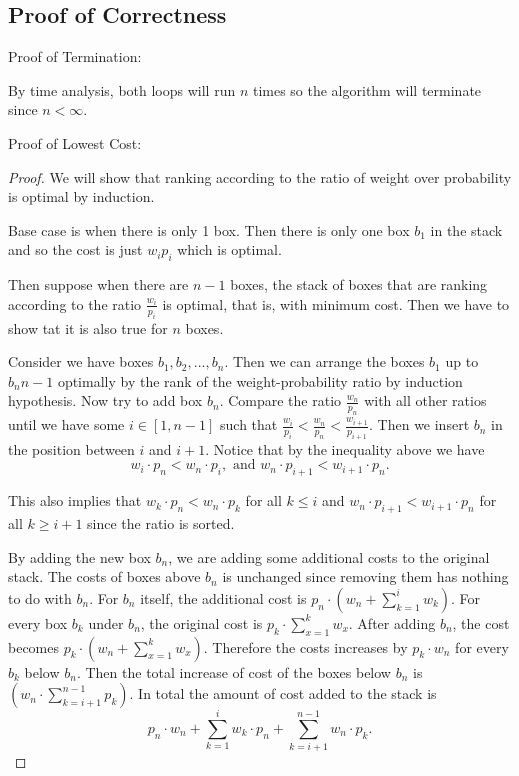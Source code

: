 \documentclass[11pt, oneside]{article}   	%
\begin{document}
\subsection{Proof of Correctness}
Proof of Termination:

By time analysis, both loops will run $n$ times so the algorithm will terminate since $n < \infty$.

Proof of Lowest Cost:
\begin{proof}

We will show that ranking according to the ratio of weight over probability is optimal by induction.

Base case is when there is only 1 box. Then there is only one box $b_1$ in the stack and so the cost is just $w_ip_i$ which is optimal.

Then suppose when there are $n-1$ boxes, the stack of boxes that are ranking according to the ratio $\frac{w_i}{p_i}$ is optimal, that is, with minimum cost. Then we have to show tat it is also true for $n$ boxes.

Consider we have boxes $b_1,b_2,...,b_n$. Then we can arrange the boxes $b_1$ up to $b_n{n-1}$ optimally by the rank of the weight-probability ratio by induction hypothesis. Now try to add box $b_n$. Compare the ratio $\frac{w_n}{p_n}$ with all other ratios until we have some $i \in [1,n-1]$ such that $\frac{w_i}{p_i}<\frac{w_n}{p_n}<\frac{w_{i+1}}{p_{i+1}}$. Then we insert $b_n$ in the position between $i$ and $i+1$. Notice that by the inequality above we have
$$w_i\cdot p_n < w_n\cdot p_i, \text{ and } w_n\cdot p_{i+1} < w_{i+1}\cdot p_n.$$

This also implies that $w_k\cdot p_n < w_n\cdot p_k$ for all $k\leq i$ and $w_n\cdot p_{i+1} < w_{i+1}\cdot p_n$ for all $k \geq i+1$ since the ratio is sorted.

By adding the new box $b_n$, we are adding some additional costs to the original stack. The costs of boxes above $b_n$ is unchanged since removing them has nothing to do with $b_n$. For $b_n$ itself, the additional cost is $p_n\cdot (w_n + \sum_{k = 1}^i w_k)$. For every box $b_k$ under $b_n$, the original cost is $p_k \cdot \sum_{x = 1}^k w_x$. After adding $b_n$, the cost becomes $p_k\cdot (w_n + \sum_{x = 1}^k w_x)$. Therefore the costs increases by $p_k\cdot w_n$ for every $b_k$ below $b_n$. Then the total increase of cost of the boxes below $b_n$ is $(w_n \cdot \sum_{k = i+1}^{n-1}p_k)$. In total the amount of cost added to the stack is $$p_n\cdot w_n + \sum_{k = 1}^i w_k \cdot p_n + \sum_{k = i+1}^{n-1}w_n \cdot p_k.$$


\end{proof}
\end{document}
